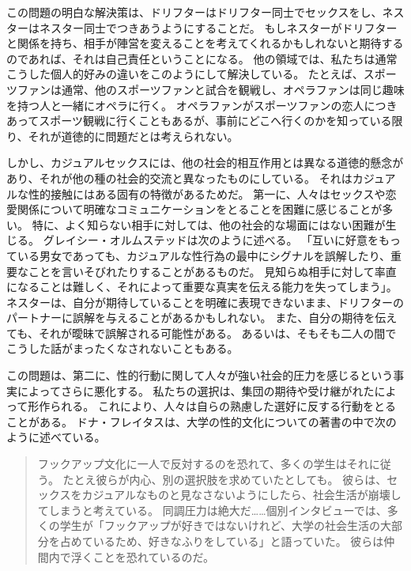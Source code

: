 \documentclass[paper=a4,book,openany]{jlreq}
\begin{document}
この問題の明白な解決策は、ドリフターはドリフター同士でセックスをし、ネスターはネスター同士でつきあうようにすることだ。
もしネスターがドリフターと関係を持ち、相手が陣営を変えることを考えてくれるかもしれないと期待するのであれば、それは自己責任ということになる。
他の領域では、私たちは通常こうした個人的好みの違いをこのようにして解決している。
たとえば、スポーツファンは通常、他のスポーツファンと試合を観戦し、オペラファンは同じ趣味を持つ人と一緒にオペラに行く。
オペラファンがスポーツファンの恋人につきあってスポーツ観戦に行くこともあるが、事前にどこへ行くのかを知っている限り、それが道徳的に問題だとは考えられない。

しかし、カジュアルセックスには、他の社会的相互作用とは異なる道徳的懸念があり、それが他の種の社会的交流と異なったものにしている。
それはカジュアルな性的接触にはある固有の特徴があるためだ。
第一に、人々はセックスや恋愛関係について明確なコミュニケーションをとることを困難に感じることが多い。
特に、よく知らない相手に対しては、他の社会的な場面にはない困難が生じる。
グレイシー・オルムステッドは次のように述べる。
「互いに好意をもっている男女であっても、カジュアルな性行為の最中にシグナルを誤解したり、重要なことを言いそびれたりすることがあるものだ。
見知らぬ相手に対して率直になることは難しく、それによって重要な真実を伝える能力を失ってしまう」\citep{olmstead18:_divor_sex_love}。
ネスターは、自分が期待していることを明確に表現できないまま、ドリフターのパートナーに誤解を与えることがあるかもしれない。
また、自分の期待を伝えても、それが曖昧で誤解される可能性がある。
あるいは、そもそも二人の間でこうした話がまったくなされないこともある。

この問題は、第二に、性的行動に関して人々が強い社会的圧力を感じるという事実によってさらに悪化する。
私たちの選択は、集団の期待や受け継がれたによって形作られる。
これにより、人々は自らの熟慮した選好に反する行動をとることがある。
ドナ・フレイタスは、大学の性的文化についての著書の中で次のように述べている。

\begin{quote}
  フックアップ文化に一人で反対するのを恐れて、多くの学生はそれに従う。
たとえ彼らが内心、別の選択肢を求めていたとしても。
彼らは、セックスをカジュアルなものと見なさないようにしたら、社会生活が崩壊してしまうと考えている。
同調圧力は絶大だ……個別インタビューでは、多くの学生が「フックアップが好きではないけれど、大学の社会生活の大部分を占めているため、好きなふりをしている」と語っていた。
彼らは仲間内で浮くことを恐れているのだ。
\citep{freitas13:_time_stop_hook_up}

\end{quote}
\end{document}
